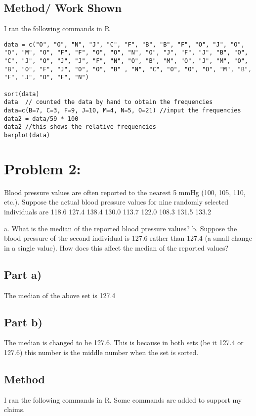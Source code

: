 \documentclass[11pt]{article}
\begin{document}
\subsection{Method/ Work Shown}
\label{sec:orgd49db7b}
I ran the following commands in R


\begin{verbatim}
data = c("O", "O", "N", "J", "C", "F", "B", "B", "F", "O", "J", "O", "O", "M", "O", "F", "F", "O", "O", "N", "O", "J", "F", "J", "B", "O", "C", "J", "O", "J", "J", "F", "N", "O", "B", "M", "O", "J", "M", "O", "B", "O", "F", "J", "O", "O", "B" , "N", "C", "O", "O", "O", "M", "B", "F", "J", "O", "F", "N")

sort(data)
data  // counted the data by hand to obtain the frequencies
data=c(B=7, C=3, F=9, J=10, M=4, N=5, O=21) //input the frequencies
data2 = data/59 * 100
data2 //this shows the relative frequencies
barplot(data)
\end{verbatim}

\section{Problem 2:}
\label{sec:orgcd709b0}
Blood pressure values are often reported to the nearest 5 mmHg (100, 105, 110, etc.). Suppose the actual blood pressure values for nine randomly selected individuals are 118.6 127.4 138.4 130.0 113.7 122.0 108.3 131.5 133.2

a. What is the median of the reported blood pressure values?
b. Suppose the blood pressure of the second individual is 127.6 rather than 127.4 (a small change in a single value). How does this affect the median of the reported values?

\subsection{Part a)}
\label{sec:orgeb06d06}
The median of the above set is 127.4

\subsection{Part b)}
\label{sec:org12a10d5}
The median is changed to be 127.6. This is because in both sets (be it 127.4 or 127.6) this number is the middle number when the set is sorted.

\subsection{Method}
\label{sec:org1b76952}
I ran the following commands in R. Some commands are added to support my claims.
\end{document}
